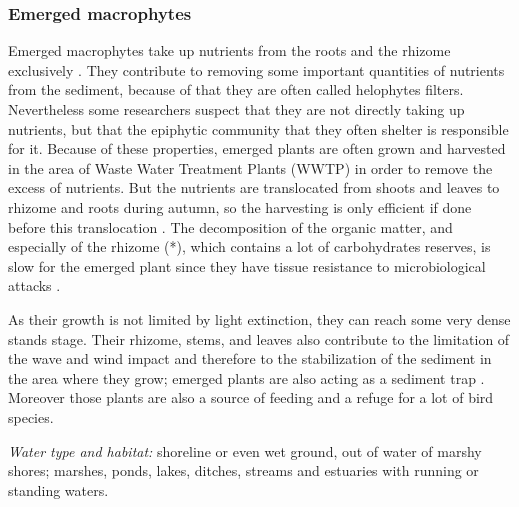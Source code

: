 \subsubsection*{Emerged macrophytes}
Emerged macrophytes take up nutrients from the roots and the rhizome exclusively \citep{GraneliSolander}.
They contribute to removing some important quantities of nutrients from the sediment, because of that they are
often called helophytes filters. Nevertheless some researchers suspect that they are not directly taking up
nutrients, but that the epiphytic community that they often shelter is responsible for it. Because of these
properties, emerged plants are often grown and harvested in the area of Waste Water Treatment Plants (WWTP)
in order to remove the excess of nutrients. But the nutrients are translocated from shoots and leaves to
rhizome and roots during autumn, so the harvesting is only efficient if done before this translocation
\citep{MeulemanEtAl}. The decomposition of the organic matter, and especially of the rhizome (*),
which contains a lot of carbohydrates reserves, is slow for the emerged plant since they have tissue
resistance to microbiological attacks \citep{GraneliSolander}.

As their growth is not limited by light extinction, they can reach some very dense stands stage. Their
rhizome, stems, and leaves also contribute to the limitation of the wave and wind impact and therefore
to the stabilization of the sediment in the area where they grow; emerged plants are also acting as a
sediment trap \citep{Coops}. Moreover those plants are also a source of feeding and a refuge for a
lot of bird species.

\emph{Water type and habitat:} shoreline or even wet ground, out of water of marshy shores; marshes, ponds,
lakes, ditches, streams and estuaries with running or standing waters.

